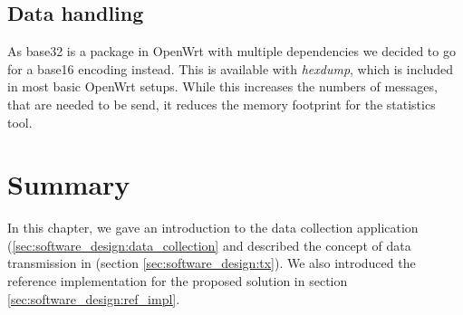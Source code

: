     
% 
\subsection{Data handling}
    As base32 is a package in OpenWrt with multiple dependencies we decided to go for a base16 encoding instead. This is available with \textit{hexdump}, which is included in most basic OpenWrt setups. While this increases the numbers of messages, that are needed to be send, it reduces the memory footprint for the statistics tool.
\section{Summary}

In this chapter, we gave an introduction to the data collection application (\ref{sec:software_design:data_collection} and described the concept of data transmission in (section \ref{sec:software_design:tx}).
We also introduced the reference implementation for the proposed solution in section \ref{sec:software_design:ref_impl}. 
%